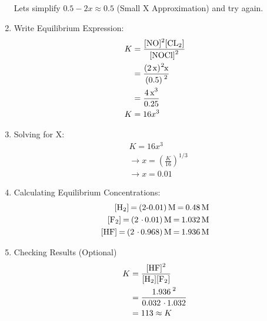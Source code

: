 \documentclass{article}  %
\begin{document}
\begin{enumerate}
    Lets simplify $0.5-2x \approx 0.5$ (Small X Approximation) and try again.
    \item Write Equilibrium Expression:
    \begin{equation*}
        \begin{aligned}
            K   &= \ce{\frac{[NO]^2[CL2]}{[NOCl]^2}} \\
                &= \ce{\frac{(2x)^2x}{(0.5)^2}} \\
                &= \ce{\frac{4x^3}{0.25}} \\
            K    &= 16x^3
        \end{aligned}
    \end{equation*}
    \item Solving for X:
    \begin{equation*}
        \begin{aligned}
            &K = 16x^3 \\
            &\rightarrow x = \left(\frac{K}{16}\right)^{1/3} \\
            &\rightarrow x = 0.01
        \end{aligned}
    \end{equation*}
    \item Calculating Equilibrium Concentrations:
    \begin{equation*}
        \begin{aligned}
            \ce{[H2] = (2-0.01)M = 0.48M} \\
            \ce{[F2] = (2*0.01)M = 1.032M} \\
            \ce{[HF] = (2*0.968)M = 1.936M} \\
        \end{aligned}
    \end{equation*}
    \item Checking Results (Optional)
    \begin{equation*}
        \begin{aligned}
            K   &= \ce{\frac{[HF]^2}{[H2][F2]}} \\
            &= \ce{\frac{1.936^2}{0.032*1.032}} \\
            &= 113 \approx K
        \end{aligned}
    \end{equation*}
\end{enumerate}

\end{document}
